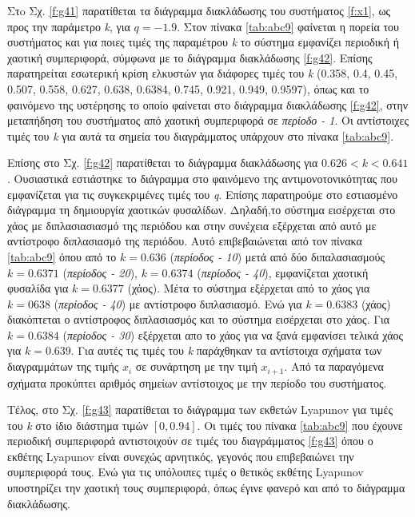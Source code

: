 Στo Σχ. \ref{f:g41} παρατίθεται τα διάγραμμα διακλάδωσης του συστήματος \ref{f:x1}, ως προς την παράμετρο \emph{k}, για $q =- 1.9$. Στον πίνακα \ref{tab:abc9} φαίνεται η πορεία του συστήματος και για ποιες τιμές της παραμέτρου \emph{k} το σύστημα εμφανίζει περιοδική ή χαοτική συμπεριφορά, σύμφωνα με το διάγραμμα διακλάδωσης \ref{f:g42}. Επίσης παρατηρείται εσωτερική κρίση ελκυστών για διάφορες τιμές του \emph{k} (0.358, 0.4, 0.45, 0.507, 0.558, 0.627, 0.638, 0.6384, 0.745, 0.921, 0.949, 0.9597), όπως και το φαινόμενο της υστέρησης το οποίο φαίνεται στο διάγραμμα διακλάδωσης \ref{f:g42}, στην μεταπήδηση του συστήματος από χαοτική συμπεριφορά σε \emph{περίοδο - 1}. Οι αντίστοιχες τιμές του \emph{k} για αυτά τα σημεία του διαγράμματος υπάρχουν στο πίνακα \ref{tab:abc9}.

Επίσης στο Σχ. \ref{f:g42} παρατίθεται το διάγραμμα διακλάδωσης για $0.626<k<0.641$. Ουσιαστικά εστιάστηκε το διάγραμμα στο φαινόμενο της αντιμονοτονικότητας που εμφανίζεται για τις συγκεκριμένες τιμές του \emph{q}. Επίσης παρατηρούμε στο εστιασμένο διάγραμμα τη δημιουργία χαοτικών φυσαλίδων. Δηλαδή,το σύστημα εισέρχεται στο χάος με διπλασιασιασμό της περιόδου και στην συνέχεια εξέρχεται από αυτό με αντίστροφο διπλασιασμό της περιόδου. Αυτό επιβεβαιώνεται από τον πίνακα \ref{tab:abc9} όπου από το $k=0.636$ (\emph{περίοδος - 10}) μετά από δύο διπαλασιασμούς $k=0.6371$ (\emph{περίοδος -   20}), $k=0.6374$ (\emph{περίοδος -  40}), εμφανίζεται χαοτική φυσαλίδα για $k=0.6377$ (χάος). Μέτα το σύστημα εξέρχεται από το χάος για $k=0638$ (\emph{περίοδος - 40}) με αντίστροφο διπλασιασμό. Ενώ για $k=0.6383$ (χάος) διακόπτεται ο αντίστροφος διπλασιασμός και το σύστημα εισέρχεται στο χάος. Για $k=0.6384$ (\emph{περίοδος - 30}) εξέρχεται απο το χάος για να ξανά εμφανίσει τελικά χάος για $k=0.639$. Για αυτές τις τιμές του \emph{k} παράχθηκαν τα αντίστοιχα σχήματα των διαγραμμάτων της τιμής \(x_i\) σε συνάρτηση με την τιμή \(x_{i+1}\). Από τα παραγόμενα σχήματα προκύπτει αριθμός σημείων αντίστοιχος με την περίοδο του συστήματος.

Τέλος, στο Σχ. \ref{f:g43} παρατίθεται το διάγραμμα των εκθετών Lyapunov για τιμές του \emph{k} στο ίδιο διάστημα τιμών $[0, 0.94]$. Οι τιμές του πίνακα \ref{tab:abc9} που έχουνε περιοδική συμπεριφορά αντιστοιχούν σε τιμές του διαγράμματος \ref{f:g43} όπου ο εκθέτης Lyapunov είναι συνεχώς αρνητικός, γεγονός που επιβεβαιώνει την συμπεριφορά τους. Ενώ για τις υπόλοιπες τιμές ο θετικός εκθέτης Lyapunov υποστηρίζει την χαοτική τους συμπεριφορά, όπως έγινε φανερό και από το διάγραμμα διακλάδωσης.\\\\


